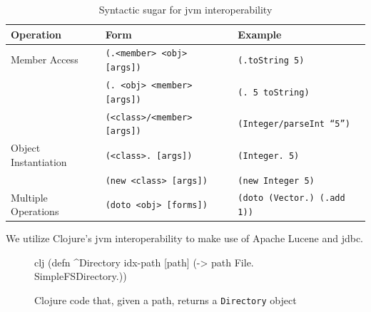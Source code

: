 			\begin{table}
				\centering
				
				\begin{tabular}{lll}
					\toprule
					Operation & Form & Example \\
					\midrule
					Member Access & \texttt{(.<member> <obj> [args])} & \texttt{(.toString 5)} \\
					 & \texttt{(. <obj> <member> [args])} & \texttt{(. 5 toString)} \\
					 & \texttt{(<class>/<member> [args])} & \texttt{(Integer/parseInt ``5'')} \\
					Object Instantiation & \texttt{(<class>. [args])} & \texttt{(Integer. 5)} \\
					 & \texttt{(new <class> [args])} & \texttt{(new Integer 5)} \\
					Multiple Operations & \texttt{(doto <obj> [forms])} & \texttt{(doto (Vector.) (.add 1))} \\
					\bottomrule
				\end{tabular}
				
				\caption{Syntactic sugar for \gls{jvm} interoperability}
				\label{tbl:jvm-interop-syntax}
			\end{table}
			
			We utilize Clojure's \gls{jvm} interoperability to make use of Apache Lucene and \gls{jdbc}.
			
			\begin{figure}
				\begin{singlespaced}
					\begin{pygments}{clj}
(defn ^Directory idx-path
  [path]
  (-> path File. SimpleFSDirectory.))
					\end{pygments}
				\end{singlespaced}
				
				\caption{Clojure code that, given a path, returns a \texttt{Directory} object}
			\end{figure}